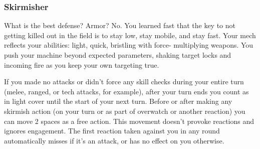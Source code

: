 \subsubsection{Skirmisher}

\begin{talent}
{What is the best defense? Armor? No. You learned fast that the key to not getting killed out in the field is to stay low, stay mobile, and stay fast. Your mech reflects your abilities: light, quick, bristling with force- multiplying weapons. You push your machine beyond expected parameters, shaking target locks and incoming fire as you keep your own targeting true.}

If you made no attacks or didn't force any skill checks during your entire turn (melee, ranged, or tech attacks, for example), after your turn ends you count as in light cover until the start of your next turn. 
Before or after making any skirmish action (on your turn or as part of overwatch or another reaction) you can move 2 spaces as a free action. This movement doesn't provoke reactions and ignores engagement. 
The first reaction taken against you in any round automatically misses if it's an attack, or has no effect on you otherwise.
\end{talent}